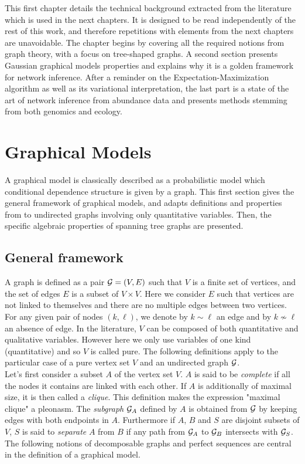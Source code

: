 
\vspace{1cm}
This first chapter  details the technical background extracted from the literature which is used in the next chapters. It is designed to be read independently  of the rest of this work, and therefore repetitions with elements from the next chapters are unavoidable.  The chapter begins by covering all the required notions from graph theory, with a  focus on tree-shaped graphs. A second section  presents Gaussian graphical models properties and explains why it is a golden framework for network inference. After a reminder on the Expectation-Maximization algorithm as well as its variational interpretation, the last part is a state of the art of network inference from abundance data and presents methods stemming from both genomics and ecology. 


 \section{Graphical Models}
 A graphical model is classically described as a probabilistic model which conditional dependence structure is given by a graph. This first section gives the general framework of graphical models, and adapts definitions and properties from \citet{Lau96} to  undirected graphs involving only quantitative variables.  Then, the specific algebraic properties of  spanning tree graphs are presented.
 \subsection{General framework}
 A graph is defined as a pair $\mathcal{G}=(V,E)$ such that $V$ is a finite set of vertices, and the set of edges $E$ is a subset of $V\times V$. Here we consider $E$ such that vertices are not linked to themselves and there are no multiple edges between two vertices. For any given pair of nodes $(k,\ell)$, we denote by $k\sim\ell$ an edge and by $k\nsim \ell$ an absence of edge. In the literature, $V$ can be composed of both quantitative and qualitative variables. However here we  only use variables of one kind (quantitative) and so $V$ is called pure. The following definitions apply to the particular case of a pure vertex set $V$ and an undirected graph $\mathcal{G}$.\\

Let's first consider a subset $A$ of the vertex set $V$. $A$ is said to be \textit{complete} if all the nodes it contains are linked with each other. If $A$ is additionally of maximal size, it is then called a \textit{clique}. This definition makes the expression "maximal clique" a pleonasm. The \textit{subgraph} $\mathcal{G}_A$ defined by $A$  is obtained from $\mathcal{G}$ by keeping edges with both endpoints in $A$. Furthermore if $A$, $B$ and $S$ are disjoint subsets of $V$, $S$ is said to \textit{separate} $A$ from $B$ if any path from $\mathcal{G}_A$ to $\mathcal{G}_B$ intersects with $\mathcal{G}_S$. The following notions of decomposable graphs and perfect sequences are central in the definition of a graphical model.
 
